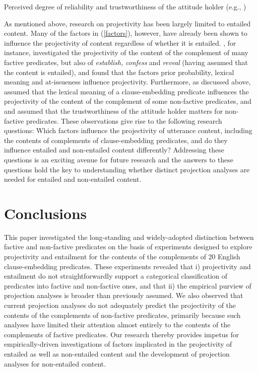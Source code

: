 \documentclass[11pt,fleqn]{article}
\newcommand{\6}{\mbox{$[\hspace*{-.6mm}[$}}
\newcommand{\9}{\mbox{$]\hspace*{-.6mm}]$}}
\begin{document}
{\begin{exe}
\begin{xlist}
\ex Perceived degree of reliability and trustworthiness of the attitude holder (e.g., \citealt{schlenker10,demarneffe-etal2012})

\end{xlist}
\end{exe}

As mentioned above, research on projectivity has been largely limited to entailed content. Many of the factors in (\ref{factors}), however, have already been shown to influence the projectivity of content regardless of whether it is entailed. \citet{tbd-variability}, for instance, investigated the projectivity of the content of the complement of many factive predicates, but also of {\em establish, confess} and {\em reveal} (having assumed that the content is entailed), and found that the factors prior probability, lexical meaning and at-issueness influence projectivity. Furthermore, as discussed above, \citet{anand-hacquard2014} assumed that the lexical meaning of a clause-embedding predicate influences the projectivity of the content of the complement of some non-factive predicates, and \citealt{schlenker10} and \citealt{demarneffe-etal2012} assumed that the trustworthiness of the attitude holder matters for non-factive predicates. These observations give rise to the following research questions: Which factors influence the projectivity of utterance content, including the contents of complements of clause-embedding predicates, and do they influence entailed and non-entailed content differently? Addressing these questions is an exciting avenue for future research and the answers to these questions hold the key to understanding whether distinct projection analyses are needed for entailed and non-entailed content.

\section{Conclusions}\label{s5}

This paper investigated the long-standing and widely-adopted distinction between factive and non-factive predicates on the basis of experiments designed to explore projectivity and entailment for the contents of the complements of 20 English clause-embedding predicates. These experiments revealed that i) projectivity and entailment do not straightforwardly support a categorical classification of predicates into factive and non-factive ones, and that ii) the empirical purview of projection analyses is broader than previously assumed. We also observed that current projection analyses do not adequately predict the projectivity of the contents of the complements of non-factive predicates, primarily because such analyses have limited their attention almost entirely to the contents of the complements of factive predicates. Our research thereby provides impetus for empirically-driven investigations of factors implicated in the projectivity of entailed as well as non-entailed content and the development of projection analyses for non-entailed content.


}
\end{document}
